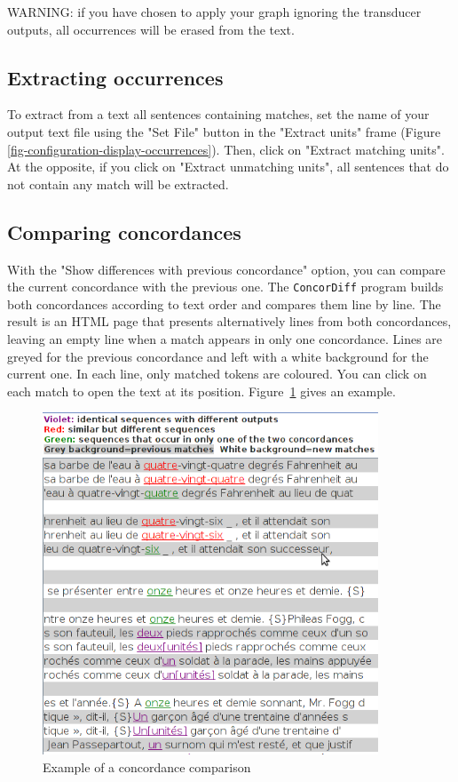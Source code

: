 \bigskip
\noindent WARNING: if you have chosen to apply your graph ignoring the
transducer outputs, all occurrences will be erased from the text.




\subsection{Extracting occurrences}
To extract from a text all sentences containing matches, set the name of your
output text file using the "Set File" button in the "Extract units" frame (Figure
\ref{fig-configuration-display-occurrences}). Then, click on "Extract matching
units". At the opposite, if you click on "Extract unmatching units", all
sentences that do not contain any match will be extracted.


\subsection{Comparing concordances}
\label{section-comparing-concordances}
With the "Show differences with previous concordance" option, you can compare the current
concordance with the previous one. The  \verb+ConcorDiff+ program builds both concordances
according to text order and compares them line by line. The result is an HTML page that
presents alternatively lines from both concordances, leaving an empty line when a match
 appears in only one concordance. 
Lines are greyed for the previous concordance and left with a white background for the current one.
In each line, only matched tokens are coloured. You can click on each match to open the text at its position. Figure~\ref{fig-concordiff} gives an example.

\begin{figure}[h]
\begin{center}
\includegraphics[width=10cm]{resources/img/fig6-33.png}
\caption{Example of a concordance comparison\label{fig-concordiff}}
\end{center}
\end{figure}

